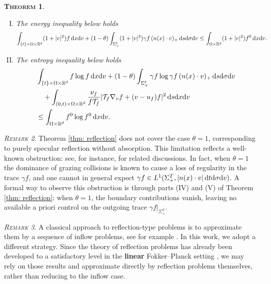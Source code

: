 \documentclass[10pt, reqno]{amsart}
\theoremstyle{plain}
\newtheorem{theorem}{\normalfont \scshape Theorem}[section]
\theoremstyle{definition}
\theoremstyle{remark}
\newtheorem{remark}[theorem]{\normalfont \scshape Remark}
\numberwithin{equation}{section}
\newcommand{\calT}{\mathcal T}
\newcommand{\R}{\mathbb{R}}
\newcommand{\dx}{\textnormal{d}x}
\newcommand{\dv}{\textnormal{d}v}
\newcommand{\dt}{\textnormal{d}t}
\newcommand{\ds}{\textnormal{d}s}
\newcommand{\tnd}{\textnormal{d}}
\begin{document}
\begin{theorem}
\begin{enumerate}[(I)]
        \begin{align*}
            \int_{(0,T)\times \Omega\times \R^d} \nu_f \calT_f |\nabla_v \sqrt{f}|^2 \,\dt\dx\dv < +\infty.
        \end{align*}
        In particular, in similar manner as Theorem \ref{thm: inflow}, the very weak formulation can be replaced with the weak formulation.
        \item The energy inequality below holds
        \begin{align*}
            \int_{\{t\}\times\Omega\times\R^d} (1+|v|^2) f\,\dx\dv + (1-\theta) \int_{\Sigma_+^t} (1+|v|^2) \gamma f \,(n(x)\cdot v)_+ \,\ds\tnd\sigma\dv  \le \int_{\Omega\times\R^d} (1+|v|^2) f^0\,\dx\dv .
        \end{align*}
        \item The entropy inequality below holds
        \begin{align*}
            &\int_{\{t\}\times\Omega\times\R^d} f\log f \,\dx\dv + (1-\theta) \int_{\Sigma_+^t} \gamma f \log \gamma f \,(n(x)\cdot v)_+ \,\ds\tnd\sigma\dv \\
        &\quad + \int_{(0,t)\times \Omega\times\R^d}  \frac{\nu_f}{f \calT_f}|\calT_f \nabla_v f + (v-u_f)f|^2 \,\ds\dx\dv \\
        &\le \int_{\Omega\times\R^d} f^0 \log f^0 \,\dx\dv.
        \end{align*}
    \end{enumerate}
\end{theorem}

\begin{remark}
Theorem \ref{thm: reflection} does not cover the case $\theta=1$, corresponding to purely specular reflection without absorption. This limitation reflects a well-known obstruction: see, for instance, \cite{GHJO20} for related discussions. In fact, when $\theta=1$ the dominance of grazing collisions is known to cause a loss of regularity in the trace $\gamma f$, and one cannot in general expect $\gamma f \in L^1(\Sigma_+^T,|n(x)\cdot v|\,\dt\tnd\sigma\dv)$. 
A formal way to observe this obstruction is through parts (IV) and (V) of Theorem \ref{thm: reflection}: when $\theta=1$, the boundary contributions vanish, leaving no available a priori control on the outgoing trace $\gamma f|_{\Sigma_+^T}$.
\end{remark}

\begin{remark}
A classical approach to reflection-type problems is to approximate them by a sequence of inflow problems, see for example \cite{Hamdache92, Carrillo98}. In this work, we adopt a different strategy. Since the theory of reflection problems has already been developed to a satisfactory level in the \textbf{linear} Fokker--Planck setting \cite[Section 2]{Zhu24}, we may rely on those results and approximate directly by reflection problems themselves, rather than reducing to the inflow case.
\end{remark}
  
\end{document}

